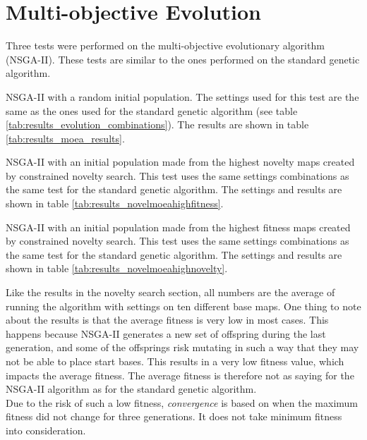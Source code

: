 \section{Multi-objective Evolution}
\label{results_moea}

Three tests were performed on the multi-objective evolutionary algorithm (NSGA-II). These tests are similar to the ones performed on the standard genetic algorithm.

\begin{my_itemize}

	\item NSGA-II with a random initial population. The settings used for this test are the same as the ones used for the standard genetic algorithm (see table \ref{tab:results_evolution_combinations}). The results are shown in table \ref{tab:results_moea_results}.

	\item NSGA-II with an initial population made from the highest novelty maps created by constrained novelty search. This test uses the same settings combinations as the same test for the standard genetic algorithm. The settings and results are shown in table \ref{tab:results_novelmoeahighfitness}.

	\item NSGA-II with an initial population made from the highest fitness maps created by constrained novelty search. This test uses the same settings combinations as the same test for the standard genetic algorithm. The settings and results are shown in table \ref{tab:results_novelmoeahighnovelty}.

\end{my_itemize}

Like the results in the novelty search section, all numbers are the average of running the algorithm with settings on ten different base maps. One thing to note about the results is that the average fitness is very low in most cases. This happens because NSGA-II generates a new set of offspring during the last generation, and some of the offsprings risk mutating in such a way that they may not be able to place start bases. This results in a very low fitness value, which impacts the average fitness. The average fitness is therefore not as saying for the NSGA-II algorithm as for the standard genetic algorithm. 
\\Due to the risk of such a low fitness, \textit{convergence} is based on when the maximum fitness did not change for three generations. It does not take minimum fitness into consideration.

